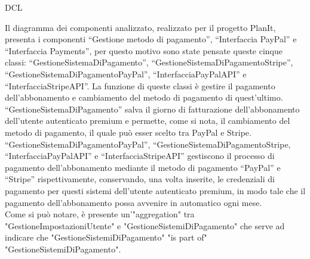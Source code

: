 \begin{listaPersonale}{DCL}
\begin{listaPersonale2}[DCL]{}
        Il diagramma dei componenti analizzato, realizzato per il progetto PlanIt, presenta i componenti “Gestione metodo di pagamento”, “Interfaccia PayPal” e “Interfaccia Payments”, per questo motivo sono state pensate queste cinque classi: “GestioneSistemaDiPagamento”, “GestioneSistemaDiPagamentoStripe”, “GestioneSistemaDiPagamentoPayPal”, “InterfacciaPayPalAPI” e “InterfacciaStripeAPI”. La funzione di queste classi è gestire il pagamento dell'abbonamento e cambiamento del metodo di pagamento di quest'ultimo. \\
        “GestioneSistemaDiPagamento” salva il giorno di fatturazione dell'abbonamento dell'utente autenticato premium e permette, come si nota, il cambiamento del metodo di pagamento, il quale può esser scelto tra PayPal e Stripe.\\
        “GestioneSistemaDiPagamentoPayPal”, “GestioneSistemaDiPagamentoStripe, “InterfacciaPayPalAPI” e “InterfacciaStripeAPI” gestiscono il processo di pagamento dell'abbonamento mediante il metodo di pagamento “PayPal” e “Stripe” rispettivamente, conservando, una volta inserite, le credenziali di pagamento per questi sistemi dell'utente autenticato premium, in modo tale che il pagamento dell'abbonamento possa avvenire in automatico ogni mese.\\
        Come si può notare, è presente un'"aggregation" tra "GestioneImpostazioniUtente" e "GestioneSistemiDiPagamento" che serve ad indicare che "GestioneSistemiDiPagamento" "is part of" "GestioneSistemiDiPagamento".


        \begin{center}
            
        \end{center}

    \end{listaPersonale2}
    \newpage



\end{listaPersonale}

